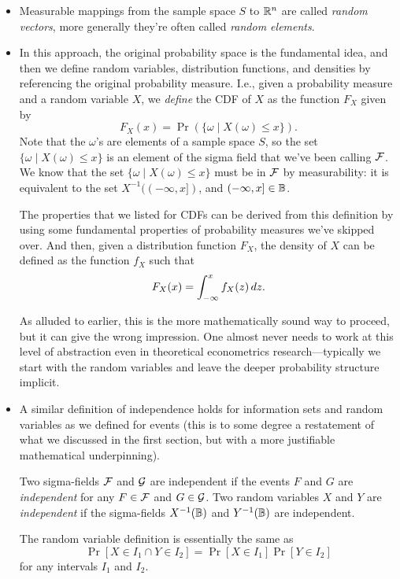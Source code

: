 \begin{itemize}
\item Measurable mappings from the sample space $S$ to $\mathbb{R}^n$ are
  called \emph{random vectors}, more generally they're often called
  \emph{random elements}.

\item In this approach, the original probability space is the
  fundamental idea, and then we define random variables, distribution
  functions, and densities by referencing the original probability
  measure.  I.e., given a probability measure and a random variable
  $X$, we \emph{define} the CDF of $X$ as the function $F_X$ given by
  \begin{equation*}
    F_X(x) = \Pr(\{\omega \mid X(\omega) \leq x\}).
  \end{equation*}
  Note that the $\omega$'s are elements of a sample space $S$, so the
  set $\{\omega \mid X(\omega) \leq x\}$ is an element of the sigma
  field that we've been calling $\mathcal{F}$.  We know that the set $\{\omega
  \mid X(\omega) \leq x\}$ must be in $\mathcal{F}$ by measurability: it is
  equivalent to the set $X^{-1}((-\infty,x])$, and $(-\infty,x] \in
  \mathbb{B}$.

  The properties that we listed for CDFs can be derived from this
  definition by using some fundamental properties of probability
  measures we've skipped over.  And then, given a distribution
  function $F_X$, the density of $X$ can be defined as the function
  $f_X$ such that
  \begin{equation*}
    F_X(x) = \int_{-\infty}^{x} f_X(z) \,dz.
  \end{equation*}

  As alluded to earlier, this is the more mathematically sound way to
  proceed, but it can give the wrong impression.  One almost never
  needs to work at this level of abstraction even in theoretical
  econometrics research---typically we start with the random variables
  and leave the deeper probability structure implicit.

\item A similar definition of independence holds for information sets
  and random variables as we defined for events (this is to some
  degree a restatement of what we discussed in the first section, but
  with a more justifiable mathematical underpinning).
  \begin{defn}
    Two sigma-fields $\mathcal{F}$ and $\mathcal{G}$ are independent if the events $F$
    and $G$ are \emph{independent} for any $F \in \mathcal{F}$ and $G \in \mathcal{G}$.
    Two random variables $X$ and $Y$ are \emph{independent} if the
    sigma-fields $X^{-1}(\mathbb{B})$ and $Y^{-1}(\mathbb{B})$ are independent.
  \end{defn}
  The random variable definition is essentially the same as
  \begin{equation*}
    \Pr[X \in I_1 \cap Y \in I_2] = \Pr[X \in I_1] \Pr[Y \in I_2]
  \end{equation*}
  for any intervals $I_1$ and $I_2$.


\end{itemize}
